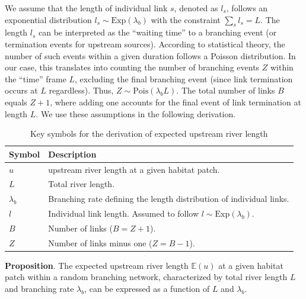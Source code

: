 \documentclass[11pt, class=article, crop=false]{standalone}
\begin{document}
We assume that the length of individual link $s$, denoted as $l_s$, follows an exponential distribution $l_s \sim \mbox{Exp}(\lambda_b)$ with the constraint $\sum_s l_s = L$.
The length $l_s$ can be interpreted as the ``waiting time'' to a branching event (or termination events for upstream sources).
According to statistical theory, the number of such events within a given duration follows a Poisson distribution.
In our case, this translates into counting the number of branching events $Z$ within the ``time'' frame $L$, excluding the final branching event (since link termination occurs at $L$ regardless).
Thus, $Z \sim \mbox{Pois}(\lambda_b L)$.
The total number of links $B$ equals $Z + 1$, where adding one accounts for the final event of link termination at length $L$.
We use these assumptions in the following derivation.

\begin{table}
    \centering
    \caption{Key symbols for the derivation of expected upstream river length}
    \begin{tabularx}{\textwidth}{ll}
        Symbol & Description\\
        \hline
        $u$ & upstream river length at a given habitat patch.\\
        $L$ & Total river length.\\
        $\lambda_b$ & Branching rate defining the length distribution of individual links.\\
        $l$ & Individual link length. Assumed to follow $l \sim \mbox{Exp}(\lambda_b)$.\\
        $B$ & Number of links ($B = Z + 1$).\\
        $Z$ & Number of links minus one ($Z = B - 1$).\\
        \hline
    \end{tabularx}
    \label{tab:key-symbol}
\end{table}


\textbf{Proposition}.
The expected upstream river length $\mathbb{E}(u)$ at a given habitat patch within a random branching network, characterized by total river length $L$ and branching rate $\lambda_b$, can be expressed as a function of $L$ and $\lambda_b$.
\end{document}
